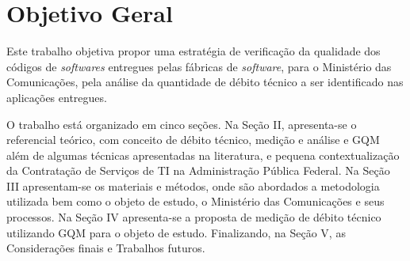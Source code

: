 \section{Objetivo Geral}
 Este trabalho objetiva propor uma estratégia de verificação da qualidade dos
 códigos de \textit{softwares} entregues pelas fábricas de \textit{software}, para o Ministério
 das Comunicações, pela análise da quantidade de débito técnico a ser identificado
 nas aplicações entregues.

 O trabalho está organizado em cinco seções. Na Seção II, apresenta-se o
 referencial teórico, com conceito de débito técnico, medição e análise e GQM
 além de algumas técnicas
 apresentadas na literatura, e pequena contextualização da Contratação de
 Serviços de TI na Administração Pública Federal. Na Seção III apresentam-se
 os materiais e métodos, onde são abordados a metodologia utilizada bem como o
 objeto de estudo, o Ministério das Comunicações e seus processos. Na Seção IV
 apresenta-se a proposta de medição de débito técnico utilizando GQM para o objeto de estudo.
 Finalizando, na Seção V, as Considerações finais e Trabalhos futuros.
